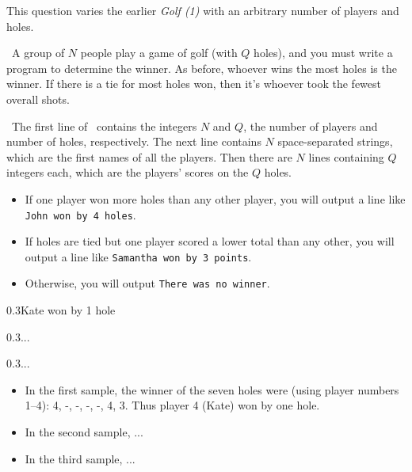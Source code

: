 

This question varies the earlier \emph{Golf (1)} with an arbitrary number of players and
holes.

\Question\ A group of $N$ people play a game of golf (with $Q$ holes), and you must write
a program to determine the winner. As before, whoever wins the most holes is the winner.
If there is a tie for most holes won, then it's whoever took the fewest overall shots.

\Input\ The first line of \IN\ contains the integers $N$ and $Q$, the number of players
and number of holes, respectively. The next line contains $N$ space-separated strings,
which are the first names of all the players. Then there are $N$ lines containing $Q$
integers each, which are the players' scores on the $Q$ holes.

\Output
\begin{itemize}
  \item If one player won more holes than any other player, you will output a line like
    \texttt{John won by 4 holes}.
  \item If holes are tied but one player scored a lower total than any other, you will
    output a line like \texttt{Samantha won by 3 points}.
  \item Otherwise, you will output \texttt{There was no winner}.
\end{itemize}

\Sample

       {0.3}{Kate won by 1 hole}

\vspace{12pt}
       {0.3}{...}

\vspace{12pt}
       {0.3}{...}

\Explanation

\begin{itemize}
  \item In the first sample, the winner of the seven holes were (using player numbers
    1--4): 4, -, -, -, -, 4, 3. Thus player 4 (Kate) won by one hole.
    \item In the second sample, ...
    \item In the third sample, ...
\end{itemize}

